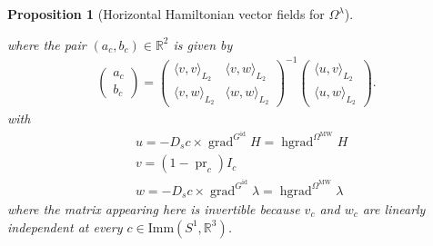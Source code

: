\documentclass[12pt]{amsart}
\newtheorem{proposition}[theorem]{Proposition}
\theoremstyle{definition}
\newcommand{\R}{\mathbb R}
\newcommand{\id}{\mathrm{id}}
\newcommand{\Imm}{\mathrm{Imm}}
\newcommand{\OmMW}{\Omega^{\operatorname{MW}}}
\def\la{\lambda}
\def\Om{\Omega}
\def\x{\times}
\def\R{{\mathbb R}}
\let\on=\operatorname
\begin{document}
\begin{proposition}[Horizontal Hamiltonian vector fields for $\Om^{\la}$]
\begin{enumerate}[label=(\alph*)]
where the pair $(a_c,b_c)\in \R^2$ is given by
\begin{align}
\begin{pmatrix}
a_c \\
b_c
\end{pmatrix}
=
\begin{pmatrix}
\langle v,v\rangle_{L_2} & \langle v,w\rangle_{L_2} \\
\langle v,w\rangle_{L_2} &\langle w,w\rangle_{L_2}
\end{pmatrix}^{-1}
\begin{pmatrix}
\langle u,v\rangle_{L_2}\\
\langle u,w\rangle_{L_2}
\end{pmatrix}.
\end{align}
with
\begin{align}
    &u=-D_s c \x \on{grad}^{G^\id}H=\on{hgrad}^{\OmMW}H\\
    &v=(1-\on{pr}_c)I_c\\
    &w=-D_s c \x \on{grad}^{G^\id}\la=\on{hgrad}^{\OmMW}\la
\end{align}
where the matrix appearing here is invertible because $v_c$ and $w_c$ are linearly independent at every $c\in \Imm(S^1,\R^3)$.


\end{enumerate}
\end{proposition}
\end{document}
